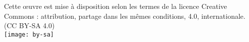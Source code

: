 \center
\vfill
\aldine
\vfill
Cette œuvre est mise à disposition selon les termes de la licence Creative Commons : attribution, partage dans les mêmes conditions, 4.0, internationale.\quad(CC BY-SA 4.0)\\[1em]

\texttt{[image: by-sa]}
\vfill
